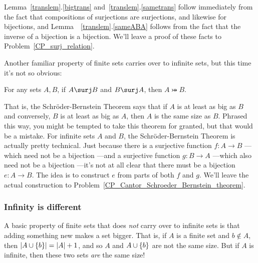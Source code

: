 Lemma~\ref{translem}.\ref{bigtrans} and~\ref{translem}.\ref{sametrans}
follow immediately from the fact that compositions of surjections are
surjections, and likewise for bijections, and
Lemma~~\ref{translem}.\ref{sameABA} follows from the fact that the inverse
of a bijection is a bijection.  We'll leave a proof of these facts to
Problem~\ref{CP_surj_relation}.

Another familiar property of finite sets carries over to infinite sets,
but this time it's not so obvious:
\begin{theorem}  For any sets $A,B$, if $A \surj B$
  and $B \surj A$, then $A \bij B$.
\end{theorem}

That is, the Schr\"oder-Bernstein Theorem says that if $A$ is at least as
big as $B$ and conversely, $B$ is at least as big as $A$, then $A$ is the
same size as $B$.  Phrased this way, you might be tempted to take this
theorem for granted, but that would be a mistake.  For infinite sets $A$
and $B$, the Schr\"oder-Bernstein Theorem is actually pretty technical.
Just because there is a surjective function $f:A\to B$ ---which need not
be a bijection ---and a surjective function $g:B \to A$ ---which also need
not be a bijection ---it's not at all clear that there must be a bijection
$e:A \to B$.  The idea is to construct $e$ from parts of both $f$ and $g$.
We'll leave the actual construction to
Problem~\ref{CP_Cantor_Schroeder_Bernstein_theorem}.

\subsubsection{Infinity is different}

A basic property of finite sets that does \emph{not} carry over to
infinite sets is that adding something new makes a set bigger.  That is,
if $A$ is a finite set and $b \notin A$, then $\left|A \cup \left\{b\right\}\right| =
\left|A\right|+1$, and so $A$ and $A \cup \left\{b\right\}$ are not the same size.  But
if $A$ is infinite, then these two sets \emph{are} the same size!

